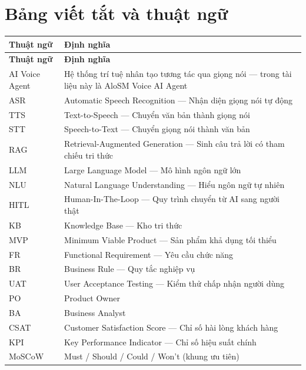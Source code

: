 \documentclass[12pt,a4paper]{article}
\begin{document}
\section*{Bảng viết tắt và thuật ngữ}
\begin{longtable}{L{2.8cm} L{11cm}}
  \toprule
  \textbf{Thuật ngữ}&\textbf{Định nghĩa}\\
  \midrule\endfirsthead
  \toprule{}\textbf{Thuật ngữ}&\textbf{Định nghĩa}\\\midrule\endhead\bottomrule\endlastfoot
  AI Voice Agent & Hệ thống trí tuệ nhân tạo tương tác qua giọng nói --- trong tài liệu này là AloSM Voice AI Agent \\
  ASR & Automatic Speech Recognition --- Nhận diện giọng nói tự động \\
  TTS & Text-to-Speech --- Chuyển văn bản thành giọng nói \\
  STT & Speech-to-Text --- Chuyển giọng nói thành văn bản \\
  RAG & Retrieval-Augmented Generation --- Sinh câu trả lời có tham chiếu tri thức \\
  LLM & Large Language Model --- Mô hình ngôn ngữ lớn \\
  NLU & Natural Language Understanding --- Hiểu ngôn ngữ tự nhiên \\
  HITL & Human-In-The-Loop --- Quy trình chuyển từ AI sang người thật \\
  KB & Knowledge Base --- Kho tri thức \\
  MVP & Minimum Viable Product --- Sản phẩm khả dụng tối thiểu \\
  FR & Functional Requirement --- Yêu cầu chức năng \\
  BR & Business Rule --- Quy tắc nghiệp vụ \\
  UAT & User Acceptance Testing --- Kiểm thử chấp nhận người dùng \\
  PO & Product Owner \\
  BA & Business Analyst \\
  CSAT & Customer Satisfaction Score --- Chỉ số hài lòng khách hàng \\
  KPI & Key Performance Indicator --- Chỉ số hiệu suất chính \\
  MoSCoW & Must / Should / Could / Won't (khung ưu tiên) \\

\end{longtable}
\end{document}
